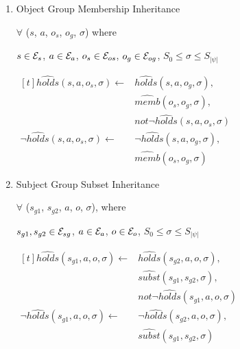 \documentclass[11pt, twocolumn]{article}
\begin{document}
\begin{enumerate}
              \item
                Object Group Membership Inheritance

                $\forall$ ($s$, $a$, $o_{s}$, $o_{g}$, $\sigma$) where

                $s \in {\cal E}_{s}$,
                $a \in {\cal E}_{a}$,
                $o_{s} \in {\cal E}_{os}$,
                $o_{g} \in {\cal E}_{og}$,
                $S_{0}{\leq}{\sigma}{\leq}S_{|\psi|}$

                \begin{math}
                  \begin{aligned}[t]
                    \hat{holds}(s, a, o_{s}, \sigma) \leftarrow &
                    \hat{holds}(s, a, o_{g}, \sigma), \\
                    & \hat{memb}(o_{s}, o_{g}, \sigma), \\
                    & not \lnot \hat{holds}(s, a, o_{s}, \sigma) \\
                    \lnot \hat{holds}(s, a, o_{s}, \sigma) \leftarrow &
                    \lnot \hat{holds}(s, a, o_{g}, \sigma), \\
                    & \hat{memb}(o_{s}, o_{g}, \sigma)
                  \end{aligned}
                \end{math}

              \item
                Subject Group Subset Inheritance

                $\forall$ ($s_{g1}$, $s_{g2}$, $a$, $o$, $\sigma$), where

                $s_{g1}, s_{g2} \in {\cal E}_{sg}$,
                $a \in {\cal E}_{a}$,
                $o \in {\cal E}_{o}$,
                $S_{0} \leq \sigma \leq S_{|\psi|}$

                \begin{math}
                  \begin{aligned}[t]
                    \hat{holds}(s_{g1}, a, o, \sigma) \leftarrow &
                    \hat{holds}(s_{g2}, a, o, \sigma), \\
                    & \hat{subst}(s_{g1}, s_{g2}, \sigma), \\
                    & not \lnot \hat{holds}(s_{g1}, a, o, \sigma) \\
                    \lnot \hat{holds}(s_{g1}, a, o, \sigma) \leftarrow &
                    \lnot \hat{holds}(s_{g2}, a, o, \sigma), \\
                    & \hat{subst}(s_{g1}, s_{g2}, \sigma)
                  \end{aligned}
                \end{math}


\end{enumerate}
\end{document}
